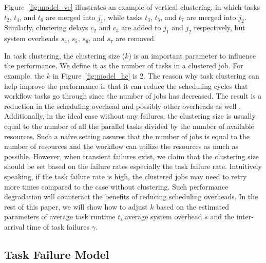 \documentclass{IOS-Book-Article}
\begin{document}
Figure~\ref{fig:model_vc} illustrates an example of vertical clustering, in which tasks $t_2$, $t_4$, and $t_6$ are merged into $j_1$, while tasks $t_3$, $t_5$, and $t_7$ are merged into $j_2$. Similarly, clustering delays $c_2$ and $c_3$ are added to $j_1$ and $j_2$ respectively, but system overheads $s_4$, $s_5$, $s_6$, and $s_7$ are removed. 


In task clustering, the clustering size ($k$) is an important parameter to influence the performance. We define it as the number of tasks in a clustered job. For example, the $k$ in Figure~\ref{fig:model_hc} is 2. The reason why task clustering can help improve the performance is that it can reduce the scheduling cycles that workflow tasks go through since the number of jobs has decreased. The result is a reduction in the scheduling overhead and possibly other overheads as well \cite{Chen2011}. Additionally, in the ideal case without any failures, the clustering size is usually equal to the number of all the parallel tasks divided by the number of available resources. Such a naïve setting assures that the number of jobs is equal to the number of resources and the workflow can utilize the resources as much as possible. However, when transient failures exist, we claim that the clustering size should be set based on the failure rates especially the task failure rate. Intuitively speaking, if the task failure rate is high, the clustered jobs may need to retry more times compared to the case without clustering. Such performance degradation will counteract the benefits of reducing scheduling overheads. In the rest of this paper, we will show how to adjust $k$ based on the estimated parameters of average task runtime $t$, average system overhead $s$ and the inter-arrival time of task failures $\gamma$. 

\subsection{Task Failure Model}


\end{document}
